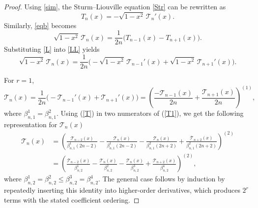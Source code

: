 \documentclass[10pt,a4paper]{amsart}
\begin{document}
\begin{proof}
    Using \eqref{sim}, the Sturm--Liouville equation \eqref{Str} can be rewritten as
    \begin{equation}\label{L}
    T_n(x)=-\sqrt{1-x^2}\,\mathcal{T}_n'(x).
    \end{equation}
    Similarly, \eqref{eqb} becomes
    \begin{equation}\label{LL}
    \sqrt{1-x^2}\,\mathcal{T}_n(x)
    =\frac{1}{2n}\bigl(T_{n-1}(x)-T_{n+1}(x)\bigr).
    \end{equation}
    Substituting \eqref{L} into \eqref{LL} yields
    \begin{equation}\label{T}
    \sqrt{1-x^2}\,\mathcal{T}_n(x)
    =\frac{1}{2n}\bigl(-\sqrt{1-x^2}\,\mathcal{T}_{n-1}'(x)
    +\sqrt{1-x^2}\,\mathcal{T}_{n+1}'(x)\bigr).
    \end{equation}
    
    For $r=1$,
    \begin{equation}\label{T1}
    \mathcal{T}_n(x)
    =\frac{1}{2n}\bigl(-\mathcal{T}_{n-1}'(x)+\mathcal{T}_{n+1}'(x)\bigr)
    =\left(\frac{-\mathcal{T}_{n-1}(x)}{2n}
    +\frac{\mathcal{T}_{n+1}(x)}{2n}\right)^{(1)},
    \end{equation}
    where $\beta^1_{n,1}=\beta^2_{n,1}.$ Using (\ref{T}) in two numerators of (\ref{T1}), we get the following representation for $\mathcal{T}_n(x)$
    \begin{align}\label{comb2}
    \mathcal{T}_n(x)&=\left(\frac{\mathcal{T}_{n-2}(x)}{\beta^1_{n,1}(2n-2)}-\frac{\mathcal{T}_{n}(x)}{\beta^1_{n,1}(2n-2)}
    -\frac{\mathcal{T}_{n}(x)}{\beta^2_{n,1}(2n+2)}+\frac{\mathcal{T}_{n+2}(x)}{\beta^2_{n,1}(2n+2)}\right)^{(2)}\nonumber\\
    &=\left(\frac{\mathcal{T}_{n-2}(x)}{\beta^1_{n,2}}-\frac{\mathcal{T}_{n}(x)}{\beta^2_{n,2}}
    -\frac{\mathcal{T}_{n}(x)}{\beta^3_{n,2}}+\frac{\mathcal{T}_{n+2}(x)}{\beta^4_{n,2}}\right)^{(2)},
    \end{align}
    where $\beta^1_{n,2}=\beta^2_{n,2}\leq \beta^3_{n,2}=\beta^4_{n,2} .$
    The general case follows by induction by repeatedly inserting this identity into
    higher-order derivatives, which produces $2^r$ terms with the stated coefficient
    ordering.
\end{proof}
\end{document}
